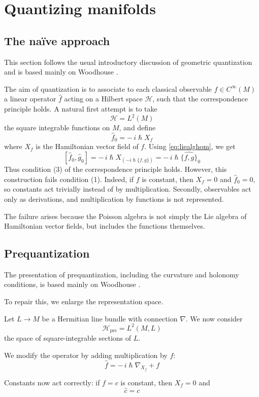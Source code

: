 \documentclass[
  12pt,
  a4paper, oneside
]{report}
\renewcommand{\hbar}{\hslash}
\theoremstyle{bolddef}
\theoremstyle{remark}
\numberwithin{equation}{chapter}
\begin{document}
\chapter{Quantizing manifolds}
\section{The naïve approach}
This section follows the usual introductory discussion of geometric quantization and is based mainly on Woodhouse \cite{Woodhouse1997}.


The aim of quantization is to associate to each classical observable
$f \in C^\infty(M)$ a linear operator $\hat f$
acting on a Hilbert space $\mathcal H$, such that the correspondence principle holds. A natural first attempt is to take
$$
\mathcal H = L^2(M)
$$
the square integrable functions on $M$, and define
$$
\hat f_0 = -\, i \hbar X_f
$$
where $X_f$ is the Hamiltonian vector field of $f$. Using \eqref{eq:liealghom}, we get
$$
[\hat f_0,\hat g_0]
=
-\, i \hbar X_{({-i \hbar\{f,g\}})}
=
-\, i \hbar \widehat{\{f,g\}}_0
$$
Thus condition (3) of the correspondence principle holds. However, this construction fails condition (1). Indeed, if $f$ is constant, then $X_f=0$ and $\hat f_0 = 0,$
so constants act trivially instead of by multiplication.
Secondly, observables act only as derivations,
and multiplication by functions is not represented.

The failure arises because the Poisson algebra
is not simply the Lie algebra of Hamiltonian vector fields,
but includes the functions themselves.

\bigskip

\section{Prequantization}
The presentation of prequantization, including the curvature and holonomy conditions, is based mainly on Woodhouse \cite{Woodhouse1997}.


To repair this, we enlarge the representation space.

Let $L\to M$ be a Hermitian line bundle
with connection $\nabla$.
We now consider
$$
\mathcal H_{\mathrm{pre}} = L^2(M,L)
$$
the space of square-integrable sections of $L$.

We modify the operator by adding multiplication by $f$:
$$
\hat f
=
-\, i \hbar \nabla_{X_f} + f
$$

Constants now act correctly:
if $f=c$ is constant, then $X_f=0$ and
$$
\hat c = c
$$
\end{document}
